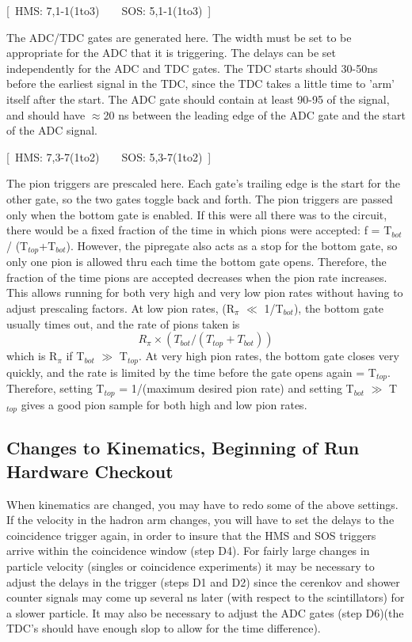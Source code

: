 \begin{description}
\item{[~HMS: 7,1-1(1to3)~~~~SOS: 5,1-1(1to3)~]}
\end{description}

The ADC/TDC gates are generated here. The width must be set to be
appropriate for the ADC that it is triggering. The delays can be set
independently for the ADC and TDC gates. The TDC starts should 30-50ns
before the earliest signal in the TDC, since the TDC takes a little time
to 'arm' itself after the start. The ADC gate should contain at least 90-95%
of the signal, and should have $\approx$20 ns between the leading edge
of the ADC gate and the start of the ADC signal.

\begin{description}
\item{[~HMS: 7,3-7(1to2)~~~~SOS: 5,3-7(1to2)~]}
\end{description}

The pion triggers are prescaled here. Each gate's trailing edge is
the start for the other gate, so the two gates toggle back and forth. The
pion triggers are passed only when the bottom gate is enabled. If this were
all there was to the circuit, there would be a fixed fraction of the time
in which pions were accepted: f = T$_{bot}$ / (T$_{top}$+T$_{bot}$). However,
the pipregate also acts as a stop for the bottom gate, so only one pion is allowed
thru each time the bottom gate opens. Therefore, the fraction of the time
pions are accepted decreases when the pion rate increases. This allows
running for both very high and very low pion rates without having to
adjust prescaling factors. At low pion rates, (R$_\pi$ $\ll$ 1/T$_{bot}$),
the bottom gate usually times out, and the rate of pions taken is
$$
	R_\pi \times (T_{bot} / (T_{top} + T_{bot}))
$$
which is R$_\pi$ if T$_{bot}$ $\gg$ T$_{top}$. At very high pion rates, the
bottom gate closes very quickly, and the rate is limited by the time before
the gate opens again = T$_{top}$. Therefore, setting T$_{top}$
= 1/(maximum desired pion rate) and setting T$_{bot}$ $\gg$ T$_{top}$
gives a good pion sample for both high and low pion rates.

\subsection {Changes to Kinematics, Beginning of Run Hardware Checkout}

When kinematics are changed, you may have to redo some of the above
settings. If the velocity in the hadron arm changes, you will have to
set the delays to the coincidence trigger again, in order to insure that the
HMS and SOS triggers arrive within the coincidence window (step D4). For
fairly large changes in particle velocity (singles or coincidence experiments)
it may be necessary to adjust the delays in the trigger (steps D1 and D2) since
the cerenkov and shower counter signals may come up several ns later (with
respect to the scintillators) for a slower particle. It may also be necessary
to adjust the ADC gates (step D6)(the TDC's should have enough slop to allow
for the time difference).


